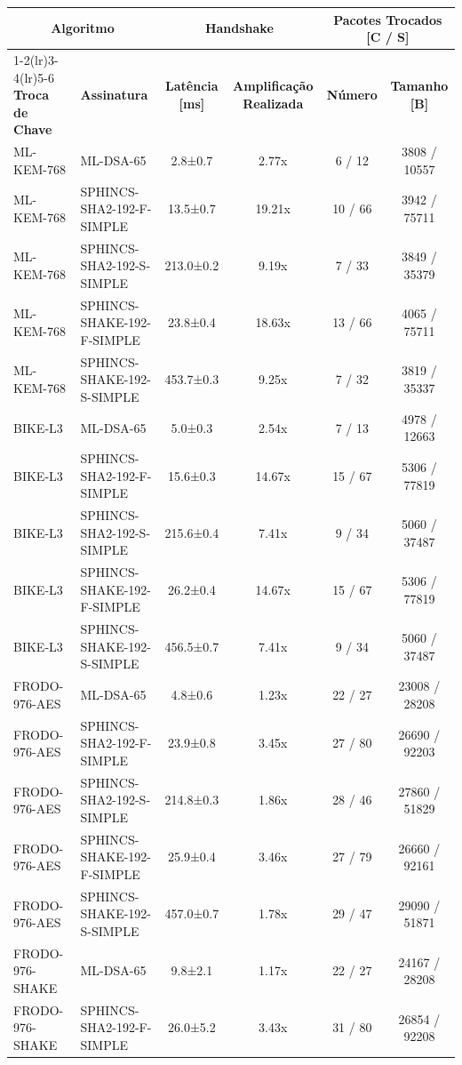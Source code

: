 \documentclass[10pt]{article}
\begin{document}
\centering
\small
\begin{tabular}{@{}l l c c c c@{}}
\toprule
\multicolumn{2}{c}{\textbf{Algoritmo}} & \multicolumn{2}{c}{\textbf{Handshake}} & \multicolumn{2}{c}{\textbf{Pacotes Trocados [C / S]}} \\
\cmidrule(lr){1-2}\cmidrule(lr){3-4}\cmidrule(lr){5-6}
\textbf{Troca de Chave} & \textbf{Assinatura} & \textbf{Latência [ms]} & \textbf{Amplificação Realizada} & \textbf{Número} & \textbf{Tamanho [B]} \\
\midrule
ML-KEM-768 & ML-DSA-65 & 2.8±0.7 & 2.77x & 6 / 12 & 3808 / 10557 \\
ML-KEM-768 & SPHINCS-SHA2-192-F-SIMPLE & 13.5±0.7 & 19.21x & 10 / 66 & 3942 / 75711 \\
ML-KEM-768 & SPHINCS-SHA2-192-S-SIMPLE & 213.0±0.2 & 9.19x & 7 / 33 & 3849 / 35379 \\
ML-KEM-768 & SPHINCS-SHAKE-192-F-SIMPLE & 23.8±0.4 & 18.63x & 13 / 66 & 4065 / 75711 \\
ML-KEM-768 & SPHINCS-SHAKE-192-S-SIMPLE & 453.7±0.3 & 9.25x & 7 / 32 & 3819 / 35337 \\
BIKE-L3 & ML-DSA-65 & 5.0±0.3 & 2.54x & 7 / 13 & 4978 / 12663 \\
BIKE-L3 & SPHINCS-SHA2-192-F-SIMPLE & 15.6±0.3 & 14.67x & 15 / 67 & 5306 / 77819 \\
BIKE-L3 & SPHINCS-SHA2-192-S-SIMPLE & 215.6±0.4 & 7.41x & 9 / 34 & 5060 / 37487 \\
BIKE-L3 & SPHINCS-SHAKE-192-F-SIMPLE & 26.2±0.4 & 14.67x & 15 / 67 & 5306 / 77819 \\
BIKE-L3 & SPHINCS-SHAKE-192-S-SIMPLE & 456.5±0.7 & 7.41x & 9 / 34 & 5060 / 37487 \\
FRODO-976-AES & ML-DSA-65 & 4.8±0.6 & 1.23x & 22 / 27 & 23008 / 28208 \\
FRODO-976-AES & SPHINCS-SHA2-192-F-SIMPLE & 23.9±0.8 & 3.45x & 27 / 80 & 26690 / 92203 \\
FRODO-976-AES & SPHINCS-SHA2-192-S-SIMPLE & 214.8±0.3 & 1.86x & 28 / 46 & 27860 / 51829 \\
FRODO-976-AES & SPHINCS-SHAKE-192-F-SIMPLE & 25.9±0.4 & 3.46x & 27 / 79 & 26660 / 92161 \\
FRODO-976-AES & SPHINCS-SHAKE-192-S-SIMPLE & 457.0±0.7 & 1.78x & 29 / 47 & 29090 / 51871 \\
FRODO-976-SHAKE & ML-DSA-65 & 9.8±2.1 & 1.17x & 22 / 27 & 24167 / 28208 \\
FRODO-976-SHAKE & SPHINCS-SHA2-192-F-SIMPLE & 26.0±5.2 & 3.43x & 31 / 80 & 26854 / 92208 \\

\end{tabular}
\end{document}
